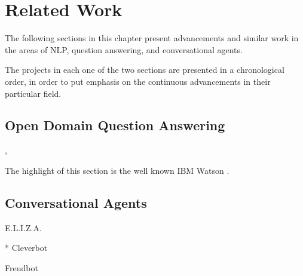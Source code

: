 \chapter{Related Work}
\label{chapter:related-work}

The following sections in this chapter present advancements and similar work in the areas of NLP, question answering, and conversational agents.

The projects in each one of the two sections are presented in a chronological order, in order to put emphasis on the continuous advancements in their particular field.

\section{Open Domain Question Answering}
\label{sec:related-qa}

\cite{Giunchiglia2004}, \cite{Giunchiglia2007}

\cite{Kopp2005}

\cite{Echihabi2006}

\cite{Taylor2007}

\cite{Mehta2007}

The highlight of this section is the well known IBM Watson \cite{Ferrucci2010}.

\cite{Moritz}

\cite{Yih2013}

\section{Conversational Agents}
\label{sec:related-conversational-agent}

E.L.I.Z.A. \cite{Weizenbaum1966}

* Cleverbot

Freudbot \cite{Heller2005}

\cite{Kerry2009}
